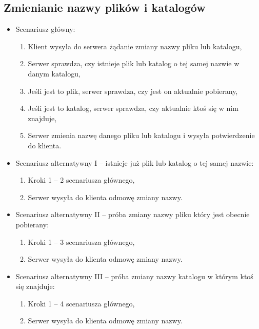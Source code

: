 \documentclass[8pt,a4paper]{article}
\begin{document}
\subsection{Zmienianie nazwy plików i katalogów}
\begin{itemize}
    \item Scenariusz główny:
    \begin{enumerate}
        \item Klient wysyła do serwera żądanie zmiany nazwy pliku lub katalogu,
        \item Serwer sprawdza, czy istnieje plik lub katalog o tej samej nazwie w danym katalogu,
        \item Jeśli jest to plik, serwer sprawdza, czy jest on aktualnie pobierany,
        \item Jeśli jest to katalog, serwer sprawdza, czy aktualnie ktoś się w nim znajduje,
        \item Serwer zmienia nazwę danego pliku lub katalogu i wysyła potwierdzenie do klienta.
    \end{enumerate}

    \item Scenariusz alternatywny I -- istnieje już plik lub katalog o tej samej nazwie:
    \begin{enumerate}
        \item Kroki 1 -- 2 scenariusza głównego,
        \item Serwer wysyła do klienta odmowę zmiany nazwy.
    \end{enumerate}

    \item Scenariusz alternatywny II -- próba zmiany nazwy pliku który jest obecnie pobierany:
    \begin{enumerate}
        \item Kroki 1 -- 3 scenariusza głównego,
        \item Serwer wysyła do klienta odmowę zmiany nazwy.
    \end{enumerate}

    \item Scenariusz alternatywny III -- próba zmiany nazwy katalogu w którym ktoś się znajduje:
    \begin{enumerate}
        \item Kroki 1 -- 4 scenariusza głównego,
        \item Serwer wysyła do klienta odmowę zmiany nazwy.
    \end{enumerate}
\end{itemize}
\end{document}
